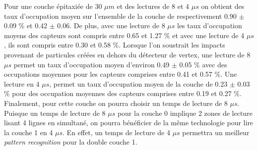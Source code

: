   \medskip
  
  Pour une couche \'epitaxi\'ee de 30 $\mu m$ et des lectures de 8 et 4 $\mu s$ on obtient des taux d'occupation moyen sur l'ensemble de la couche de respectivement 0.90 $\pm$ 0.09 $\%$ et 0.42 $\pm$ 0.06. De plus, avec une lecture de 8 $\mu s$ les taux d'occupation moyens des capteurs sont compris entre 0.65 et 1.27 $\%$ et avec une lecture de 4 $\mu s$, ils sont compris entre 0.30 et 0.58 $\%$. Lorsque l'on soustrait les impacts provenant de particules cr\'e\'ees en dehors du d\'etecteur de vertex, une lecture de 8 $\mu s$ permet un taux d'occupation moyen d'environ 0.49 $\pm$ 0.05 $\%$ avec des occupations moyennes pour les capteurs comprises entre 0.41 et 0.57 $\%$. Une lecture en 4 $\mu s$, permet un taux d'occupation moyen de la couche de 0.23 $\pm$ 0.03 $\%$ pour des occupation moyennes des capteurs comprises entre 0.19 et 0.27 $\%$. Finalement, pour cette couche on pourra choisir un temps de lecture de 8 $\mu s$. Puisque un temps de lecture de 8 $\mu s$ pour la couche 0 implique 2 zones de lecture lisant 4 lignes en simultan\'e, on pourra b\'en\'eficier de la m\^eme technologie pour lire la couche 1 en 4 $\mu s$. En effet, un temps de lecture de 4 $\mu s$ permettra un meilleur \textit{pattern recognition} pour la double couche 1.
  
  \medskip
  
